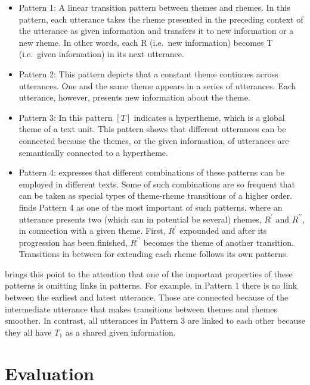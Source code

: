 \begin{itemize}
\item Pattern 1: A linear transition pattern between themes and rhemes. 
In this pattern, each utterance takes the rheme presented in the preceding context of the utterance as given information and transfers it to new information or a new rheme. 
In other words, each R (i.e.\ new information) becomes T (i.e.\ given information) in its next utterance. 


\item Pattern 2: This pattern depicts that a constant theme continues across utterances. 
One and the same theme appears in a series of utterances. 
Each utterance, however, presents new information about the theme. 


\item Pattern 3: In this pattern $[T]$ indicates a hypertheme, which is a global theme of a text unit.  
 This pattern shows that different utterances can be connected because the themes, or the given information,  of utterances are semantically connected to a hypertheme. 

 \item Pattern 4: 
  expresses that different combinations of these patterns can be employed in different texts. 
 Some of such combinations are so frequent that can be taken as special types of theme-rheme transitions of a higher order. 
   finds Pattern 4 as one of the most important of such patterns, where an utterance presents two (which can in potential be several) rhemes, $R^\prime$ and $R^{\prime\prime}$, in connection with a given theme. 
  First, $R^{\prime}$ expounded and after its progression has been finished, $R^{\prime\prime}$ becomes the theme of another transition. 
  Transitions in between for extending each rheme follows its own patterns. 
\end{itemize}

 brings this point to the attention that one of the important properties of these patterns is omitting links in patterns.  
For example, in Pattern 1 there is no link between the earliest and latest utterance. 
Those are connected because of the intermediate utterance that makes transitions between themes and rhemes smoother. 
In contrast, all utterances in Pattern 3  are linked to each other because they all have $T_1$ as a shared given information. 

\section{Evaluation}
\label{sec:coh-eval}

